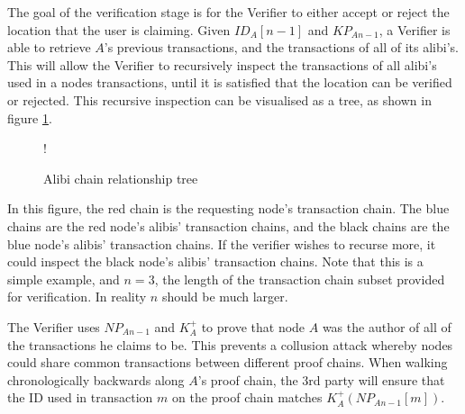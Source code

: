 \null
The goal of the verification stage is for the Verifier to either accept or reject the location that the user is claiming. Given $ID_{A}[n-1]$ and $KP_{An-1}$, a Verifier is able to retrieve $A$'s previous transactions, and the transactions of all of its alibi's. This will allow the Verifier to recursively inspect the transactions of all alibi's used in a nodes transactions, until it is satisfied that the location can be verified or rejected. This recursive inspection can be visualised as a tree, as shown in figure \ref{fig:tree}.

\begin{figure}[H]
\begin{center}
 {!} {}
\caption{Alibi chain relationship tree}
\label{fig:tree}
\end{center}
\end{figure}

In this figure, the red chain is the requesting node's transaction chain. The blue chains are the red node's alibis' transaction chains, and the black chains are the blue node's alibis' transaction chains. If the verifier wishes to recurse more, it could inspect the black node's alibis' transaction chains. Note that this is a simple example, and $n = 3$, the length of the transaction chain subset provided for verification. In reality $n$ should be much larger.

The Verifier uses $NP_{An-1}$ and $K^{+}_A$ to prove that node $A$ was the author of all of the transactions he claims to be. This prevents a collusion attack whereby nodes could share common transactions between different proof chains. When walking chronologically backwards along $A$'s proof chain, the 3rd party will ensure that the ID used in transaction $m$ on the proof chain matches $K^{+}_A(NP_{An-1}[m])$.

